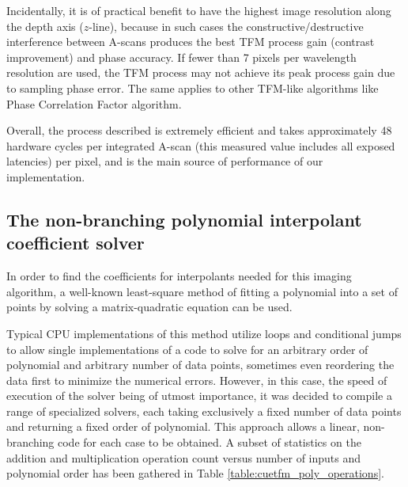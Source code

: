 Incidentally, it is of practical benefit to have the highest image resolution along the depth axis ($z$-line), because in such cases the constructive/destructive interference between A-scans produces the best TFM process gain (contrast improvement) and phase accuracy. If fewer than 7 pixels per wavelength resolution are used, the TFM process may not achieve its peak process gain due to sampling phase error\cite{wagdy_errors_1985}. The same applies to other TFM-like algorithms like Phase Correlation Factor algorithm.

Overall, the process described is extremely efficient and takes approximately 48 hardware cycles per integrated A-scan (this measured value includes all exposed latencies) per pixel, and is the main source of performance of our implementation.

\subsection{The non-branching polynomial interpolant coefficient solver}
In order to find the coefficients for interpolants needed for this imaging algorithm, a well-known least-square method of fitting a polynomial into a set of points by solving a matrix-quadratic equation can be used. 

Typical CPU implementations of this method utilize loops and conditional jumps to allow single implementations of a code to solve for an arbitrary order of polynomial and arbitrary number of data points, sometimes even reordering the data first to minimize the numerical errors. However, in this case, the speed of execution of the solver being of utmost importance, it was decided to compile a range of specialized solvers, each taking exclusively a fixed number of data points and returning a fixed order of polynomial. This approach allows a linear, non-branching code for each case to be obtained. A subset of statistics on the addition and multiplication operation count versus number of inputs and polynomial order has been gathered in Table \ref{table:cuetfm_poly_operations}.

